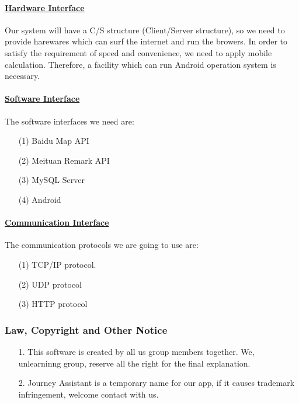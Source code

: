 \documentclass[10pt]{article}
\begin{document}
\paragraph{\underline{Hardware Interface}}
Our system will have a C/S structure (Client/Server structure), so we need to provide harewares which can surf the internet and run the browers. In order to satisfy the requirement of speed and convenience, we need to apply mobile calculation. Therefore, a facility which can run Android operation system is necessary.

\paragraph{\underline{Software Interface}}
The software interfaces we need are:

\begin{itemize}
	\item[(1)] Baidu Map API
	\item[(2)]Meituan Remark API
	\item[(3)]MySQL Server
	\item[(4)]Android
	
\end{itemize}

\paragraph{\underline{Communication Interface}}
The communication protocols we are going to use are:

\begin{itemize}
	\item[(1)] TCP/IP protocol.
	\item[(2)] UDP protocol
	\item[(3)] HTTP protocol
	
\end{itemize}

\subsubsection{Law, Copyright and Other Notice}
\begin{itemize}
	\item[1.]This software is created by all us group members together. We, unlearninng group, reserve all the right for the final explanation.
	\item[2.] Journey Assistant is a temporary name for our app, if it causes trademark infringement, welcome contact with us.
	
\end{itemize}
\end{document}

